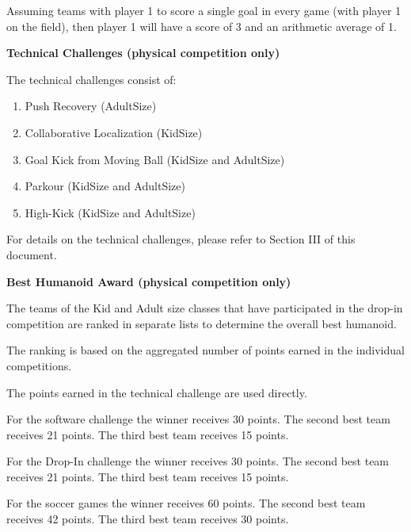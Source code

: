 Assuming teams with player 1 to score a single goal in every game (with player 1 on the field), then player 1 will have a score of 3 and an arithmetic average of 1.

\bigskip

{\bfseries Technical Challenges (physical competition only)}

\headlinebox

The technical challenges consist of:

\begin{enumerate}
\item Push Recovery (AdultSize)
\item Collaborative Localization (KidSize)
\item Goal Kick from Moving Ball (KidSize and AdultSize)
\item Parkour (KidSize and AdultSize)
\item High-Kick (KidSize and AdultSize)
\end{enumerate}

For details on the technical challenges, please refer to Section III of this document.

\bigskip

\newpage
{\bfseries Best Humanoid Award (physical competition only)}

\headlinebox
 
The teams of the Kid and Adult size classes that have
participated in the drop-in competition are ranked in separate lists to
determine the overall best humanoid.

The ranking is based on the aggregated number of points earned in the individual competitions.

\bigskip

The points earned in the technical challenge are used directly.

\bigskip

For the software challenge the winner receives 30 points. The second best team receives 21 points. The third best team receives 15 points.

\bigskip

For the Drop-In challenge the winner receives 30 points. The second best team receives 21 points. The third best team receives 15 points.


\bigskip

For the soccer games the winner receives 60 points. The second best team receives 42 points. The third best team receives 30 points.

\bigskip

